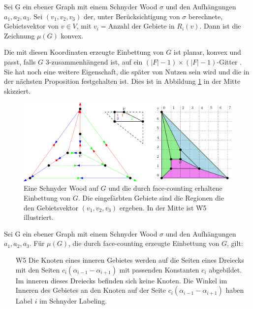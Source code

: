 \begin{theorem}
Sei G ein ebener Graph mit einem Schnyder Wood $\sigma$ und den Aufhängungen $a_1,a_2,a_3$. Sei $(v_1,v_2,v_3)$ der, unter Berücksichtigung von $\sigma$ berechnete, Gebietsvektor von $v \in V$, mit $ v_i = \text{Anzahl der Gebiete in }R_i(v).$ Dann ist die Zeichnung $\mu(G)$ konvex.
\end{theorem}

Die mit diesen Koordinaten erzeugte Einbettung von $G$ ist planar, konvex und passt, falls $G$ 3-zusammenhängend ist, auf ein $(|F|-1)\times(|F|-1)$-Gitter \cite[Korollar 2.8]{felsner12}. Sie hat noch eine weitere Eigenschaft, die später von Nutzen sein wird und die in der nächsten Proposition festgehalten ist.  Dies ist in Abbildung \ref{face_counting} in der Mitte skizziert.

\begin{figure}
	\centering
  \includegraphics[width=1\textwidth]{face_counting.png}
	\caption{Eine Schnyder Wood auf $G$ und die durch face-counting erhaltene Einbettung von $G$. Die eingefärbten Gebiete sind die Regionen die den Gebietsvektor $(v_1,v_2,v_3)$ ergeben. In der Mitte ist W5 illustriert.}
	\label{face_counting}
\end{figure}

\begin{proposition}\label{w5}
Sei G ein ebener Graph mit einem Schnyder Wood $\sigma$ und den Aufhängungen $a_1,a_2,a_3$. Für $\mu(G)$, die durch face-counting erzeugte Einbettung von $G$, gilt:
\begin{itemize}
\item [W5] Die Knoten eines inneren Gebietes werden auf die Seiten eines Dreiecks mit den Seiten $c_i(\alpha_{i-1}-\alpha_{i+1})$ mit passenden Konstanten $c_i$ abgebildet. Im inneren dieses Dreiecks befinden sich keine Knoten. Die Winkel im Inneren des Gebietes an den Knoten auf der Seite $c_i(\alpha_{i-1}-\alpha_{i+1})$ haben Label $i$ im Schnyder Labeling.
\end{itemize}
\end{proposition}

